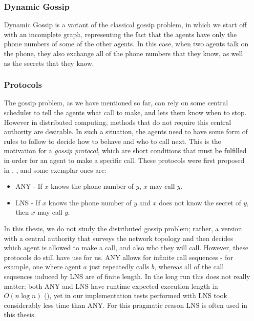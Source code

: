 \documentclass[12pt, a4paper]{article}
\begin{document}
\subsubsection{Dynamic Gossip}

Dynamic Gossip is a variant of the classical gossip problem, in which we start
off with an incomplete graph, representing the fact that the agents have only
the phone numbers of some of the other agents. In this case, when two agents
talk on the phone, they also exchange all of the phone numbers that they know, as
well as the secrets that they know.

\subsubsection{Protocols}

The gossip problem, as we have mentioned so far, can rely on some central
scheduler to tell the agents what call to make, and lets them know when to stop.
However in distributed computing, methods that do not require this central
authority are desirable. In such a situation, the agents need to have some form
of rules to follow to decide how to behave and who to call next. This is the
motivation for a \textit{gossip protocol}, which are short conditions that must
be fulfilled in order for an agent to make a specific call. These protocols were
first proposed in \cite{EPfDG}, \cite{KnowledgeandGossip}, and some exemplar
ones are:

\begin{itemize}
\item \textsf{ANY} - If $x$ knows the phone number of $y$, $x$ may call $y$.
\item \textsf{LNS} - If $x$ knows the phone number of $y$ and $x$ does not
    know the secret of $y$, then $x$ may call $y$.
\end{itemize}

In this thesis, we do not study the distributed gossip problem; rather, a
version with a central authority that surveys the network topology and then
decides which agent is allowed to make a call, and also who they will call.
However, these protocols do still have use for us. \textsf{ANY} allows for
infinite call sequences - for example, one where agent $a$ just repeatedly calls
$b$, whereas all of the call sequences induced by \textsf{LNS} are of finite
length. In the long run this does not really matter; both \textsf{ANY} and
\textsf{LNS} have runtime expected execution length in $O(n \log n)$
(\cite{DynamicGossip}), yet in our implementation tests performed with
\textsf{LNS} took considerably less time than \textsf{ANY}. For this pragmatic
reason \textsf{LNS} is often used in this thesis.
\end{document}
